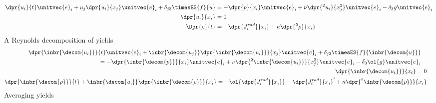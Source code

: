 \begin{derivation}
\label{der:fields}
\begin{subequations}\label{eq:inhomo1}
\begin{align}
\dpr{u_i}{t} \unitvec{e}_i
+
u_j \dpr{u_i}{x_j}\unitvec{e}_i
+
\delta_{j3}\timesES{f}{u}
&=
-\dpr{p}{x_i}	\unitvec{e}_i
+ \nu \dpr{^2u_i}{x_j^2}\unitvec{e}_i
- \delta_3 g\unitvec{e}_i \label{eq:inhomoNS}\\
\dpr{u_i}{x_i}
&=
0 \label{eq:inhomoCON}\\
\Dpr{\rho}{t}
&=
-\dpr{J_{i}^{rad}}{x_i}
+   \kappa \dpr{^2 \rho}{x_i} \label{eq:inhomoSTATE}
\end{align}
\end{subequations}
A Reynolds decomposition of  yields
\begin{subequations} \label{eq:inhomoDECOMP}
\begin{align}
\begin{split}
\dpr{\inbr{\decom{u_i}}}{t}\unitvec{e}_i
+
\inbr{\decom{u_j}} \dpr{\inbr{\decom{u_i}}}{x_j}\unitvec{e}_i
+
\delta_{j3}\timesES{f}{\inbr{\decom{u}}}\\
=
-\dpr{\inbr{\decom{p}}}{x_i}	\unitvec{e}_i
+ \nu \dpr{^2\inbr{\decom{u_i}}}{x_j^2}\unitvec{e}_i
- \delta_3 \ol{g} \unitvec{e}_i\label{eq:decompfin}
&\end{split}\\
\dpr{\inbr{\decom{u_i}}}{x_i}
=
0 & \\
\dpr{\inbr{\decom{\rho}}}{t}
+	\inbr{\decom{u_i}}\dpr{\inbr{\decom{\rho}}}{x_i}
=
-	\ol{\dpr{J_{i}^{rad}}{x_i}}
-	\dpr{J_{i}^{rad}}{x_i}'
+   \kappa \dpr{^2 \inbr{\decom{\rho}}}{x_i}
\end{align}
\end{subequations}
Averaging  yields

\end{derivation}
